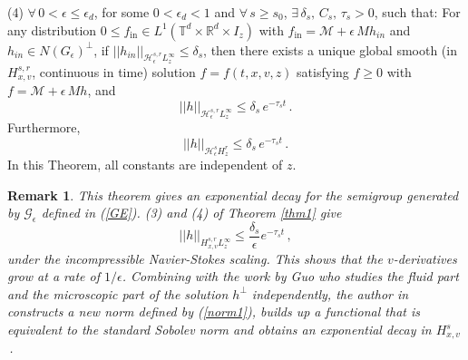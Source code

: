 \documentclass[final,onefignum,onetabnum]{siamart171218}
\newtheorem{remark}[theorem]{Remark}
\begin{document}
\begin{theorem}
(4) $\forall\, 0<\epsilon\leq \epsilon_d$, for some $0<\epsilon_d<1$ and $\forall\, s\geq s_0$, $\exists\, \delta_s, \, C_s, \, \tau_s>0$, such that:
For any distribution $0\leq f_{\text{in}}\in L^1(\mathbb T^d\times\mathbb R^d\times I_z)$ with $f_{\text{in}}=\mathcal M+\epsilon\, M h_{in}$ and
$h_{in}\in N(G_{\epsilon})^{\perp}$, if $||h_{in}||_{\mathcal H_{\epsilon}^{s,r}L_z^{\infty}}\leq\delta_s$,
then there exists a unique global smooth (in $H_{x,v}^{s,r}$, continuous in time) solution $f=f(t,x,v,z)$ satisfying
$f\geq 0$ with $f =\mathcal M + \epsilon\, M h$,  and
\begin{equation}\label{INS} ||h||_{\mathcal H_{\epsilon}^{s,r}L_z^{\infty}} \leq \delta_s\, e^{-\tau_s t}\,.\end{equation}
Furthermore, \begin{equation}\label{INS1} ||h||_{\mathcal H_{\epsilon}^s H_z^r} \leq \delta_s\, e^{-\tau_s t}\,.\end{equation}
In this Theorem, all constants are independent of $z$.
\end{theorem}
\begin{remark}
\label{RK2}
This theorem gives an exponential decay for the semigroup generated by $\mathcal G_{\epsilon}$ defined in (\ref{GE}).
(3) and (4) of Theorem \ref{thm1} give
$$||h||_{H_{x,v}^{s,r}L_z^{\infty}} \leq \frac{\delta_s}{\epsilon} e^{-\tau_s t}\,,$$
under the incompressible Navier-Stokes scaling. This shows that the $v$-derivatives grow at a rate of $1/\epsilon$.
Combining with the work by Guo \cite{Guo-NS} who studies
the fluid part and the microscopic part of the solution $h^{\perp}$ independently, the author in \cite{MB} constructs a new norm defined by (\ref{norm1}),
builds up a functional that is equivalent to the standard Sobolev norm and obtains an exponential decay in
$H_{x,v}^s$\,.
\end{remark}
\end{document}

